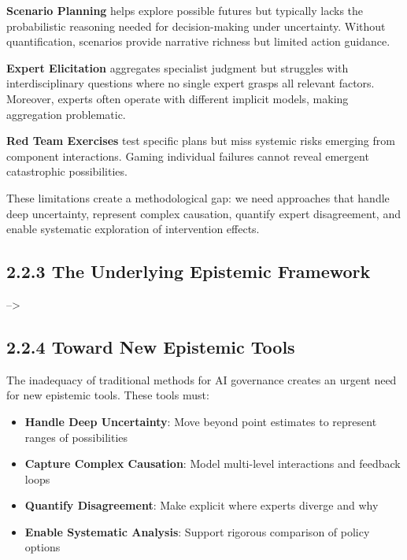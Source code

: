 \documentclass[
  11pt,
  letterpaper,
]{book}
\providecommand{\tightlist}{%
  \setlength{\itemsep}{0pt}\setlength{\parskip}{0pt}}
\begin{document}
\textbf{Scenario Planning} helps explore possible futures but typically
lacks the probabilistic reasoning needed for decision-making under
uncertainty. Without quantification, scenarios provide narrative
richness but limited action guidance.

\textbf{Expert Elicitation} aggregates specialist judgment but struggles
with interdisciplinary questions where no single expert grasps all
relevant factors. Moreover, experts often operate with different
implicit models, making aggregation problematic.

\textbf{Red Team Exercises} test specific plans but miss systemic risks
emerging from component interactions. Gaming individual failures cannot
reveal emergent catastrophic possibilities.

These limitations create a methodological gap: we need approaches that
handle deep uncertainty, represent complex causation, quantify expert
disagreement, and enable systematic exploration of intervention effects.

\textcite{hallegatte2012}

\subsection*{2.2.3 The Underlying Epistemic
Framework}\label{the-underlying-epistemic-framework}

--\textgreater{}

\subsection*{2.2.4 Toward New Epistemic
Tools}\label{sec-new-epistemic-tools}

The inadequacy of traditional methods for AI governance creates an
urgent need for new epistemic tools. These tools must:

\begin{itemize}
\tightlist
\item
  \textbf{Handle Deep Uncertainty}: Move beyond point estimates to
  represent ranges of possibilities
\item
  \textbf{Capture Complex Causation}: Model multi-level interactions and
  feedback loops
\item
  \textbf{Quantify Disagreement}: Make explicit where experts diverge
  and why
\item
  \textbf{Enable Systematic Analysis}: Support rigorous comparison of
  policy options
\end{itemize}
\end{document}
